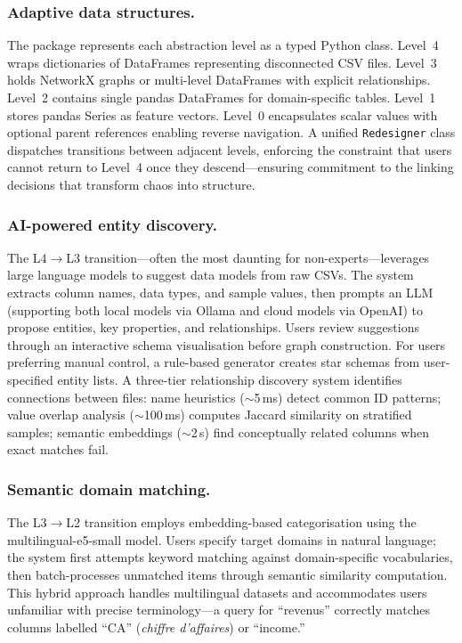 \documentclass[12pt,a4paper]{article}
\begin{document}
\subsubsection{Adaptive data structures.}
The package represents each abstraction level as a typed Python class. Level~4 wraps dictionaries of DataFrames representing disconnected CSV files. Level~3 holds NetworkX graphs or multi-level DataFrames with explicit relationships. Level~2 contains single pandas DataFrames for domain-specific tables. Level~1 stores pandas Series as feature vectors. Level~0 encapsulates scalar values with optional parent references enabling reverse navigation. A unified \texttt{Redesigner} class dispatches transitions between adjacent levels, enforcing the constraint that users cannot return to Level~4 once they descend---ensuring commitment to the linking decisions that transform chaos into structure.

\subsubsection{AI-powered entity discovery.}
The L4$\to$L3 transition---often the most daunting for non-experts---leverages large language models to suggest data models from raw CSVs. The system extracts column names, data types, and sample values, then prompts an LLM (supporting both local models via Ollama and cloud models via OpenAI) to propose entities, key properties, and relationships. Users review suggestions through an interactive schema visualisation before graph construction. For users preferring manual control, a rule-based generator creates star schemas from user-specified entity lists. A three-tier relationship discovery system identifies connections between files: name heuristics ($\sim$5\,ms) detect common ID patterns; value overlap analysis ($\sim$100\,ms) computes Jaccard similarity on stratified samples; semantic embeddings ($\sim$2\,s) find conceptually related columns when exact matches fail.

\subsubsection{Semantic domain matching.}
The L3$\to$L2 transition employs embedding-based categorisation using the multilingual-e5-small model\cite{wang2024}. Users specify target domains in natural language; the system first attempts keyword matching against domain-specific vocabularies, then batch-processes unmatched items through semantic similarity computation. This hybrid approach handles multilingual datasets and accommodates users unfamiliar with precise terminology---a query for ``revenus'' correctly matches columns labelled ``CA'' (\textit{chiffre d'affaires}) or ``income.''
\end{document}
